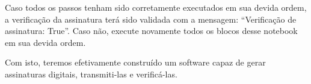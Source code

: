 \documentclass[11pt]{article}
\begin{document}
    Caso todos os passos tenham sido corretamente executados em sua devida
ordem, a verificação da assinatura terá sido validada com a mensagem:
``Verificação de assinatura: True''. Caso não, execute novamente todos
os blocos desse notebook em sua devida ordem.

Com isto, teremos efetivamente construído um software capaz de gerar
assinaturas digitais, transmiti-las e verificá-las.


    
    
    
\end{document}
